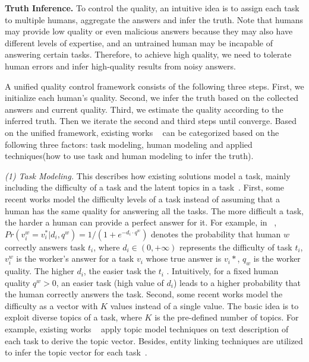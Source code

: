 \textbf{Truth Inference.}
To control the quality, an intuitive idea is to assign each task to multiple humans, aggregate the answers and infer the truth. 
Note that humans may provide low quality or even malicious answers because they  may also have different levels of expertise, and an untrained human may be incapable of answering certain tasks. Therefore, to achieve high quality, we need to tolerate human errors and infer high-quality results from noisy answers. 

A unified quality control framework consists of the following three steps. First, we initialize each human's quality. Second, we infer the truth based on the collected answers and current quality. Third,  we estimate the quality according to the inferred truth. Then we iterate the second and third steps until converge. Based on the unified framework, existing works ~\cite{DBLP:faitcrowd, DBLP:conf/nips/WhitehillRWBM09} can be categorized based on the following three factors: task modeling, human modeling and applied techniques(how to use task and human modeling to infer the truth).

\textit{(1) Task Modeling.} This describes how existing solutions model a task, mainly including the difficulty of a task and the latent topics in a task~\cite{DBLP:faitcrowd, DBLP:conf/nips/WhitehillRWBM09}. First, some recent works model the difficulty levels of a task instead of assuming that a human has the same quality for answering all the tasks. The more difficult a task, the harder a human can provide a perfect answer for it. 
For example, in ~\cite{DBLP:conf/nips/WhitehillRWBM09}, $Pr(v_i^w = v_i^* | d_i, q^w ) = 1/(1 + e^{−d_i ·q^w} )$ denotes the probability that human $w$ correctly answers task $t_i$, where $d_i \in (0, + \infty)$ represents the difficulty of task $t_i$, $v_i^w$ is the worker's answer for a task $v_i$ whose true answer is $v_i*$, $q_w$ is the worker quality. The higher $d_i$, the easier task the $t_i$ . Intuitively, for a fixed human quality $q^w > $0, an easier task (high value of $d_i$) leads to a higher probability that the human correctly answers the task.
Second, some recent works model the difficulty as a vector with $K$ values instead of a single value.  The basic idea is to exploit diverse topics of a task, where $K$ is the pre-defined number of topics. For example, existing works ~\cite{DBLP:icrowd,DBLP:faitcrowd} apply topic model techniques on text description of each task to derive the topic vector. Besides, entity linking techniques are utilized to infer the  topic vector for each task~\cite{DBLP:docs}.


